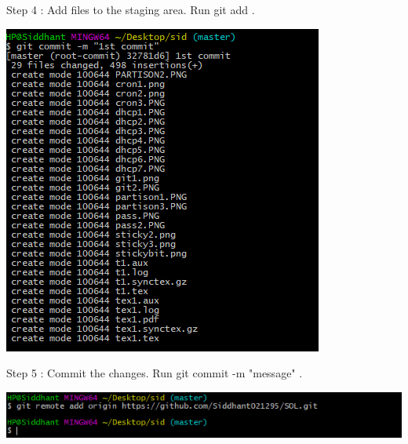 \documentclass{article}
\begin{document}
\newpage
Step 4 : Add files to the staging area. Run git add . \newline
\begin{center}
    \includegraphics[scale=1]{git4.png}
\end{center}
\newpage
Step 5 : Commit the changes. Run git commit -m "message" . \newline
\begin{center}
    \includegraphics[scale=1]{git5.png}
\end{center}
\newpage
\end{document}
